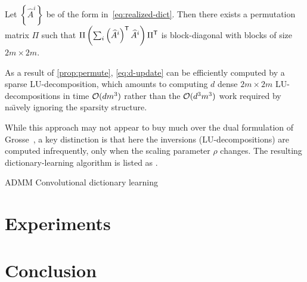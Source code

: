 \documentclass{article} %
\begin{document}
\begin{proposition}
Let $\left\{\widehat{A}^i\right\}$ be of the form in~\eqref{eq:realized-dict}.  
Then there exists a permutation matrix $\Pi$ such that 
$\Pi\left(\sum_i \left(\widehat{A}^i\right)^\mathsf{T} \widehat{A}^i \right)\Pi^\mathsf{T}$ 
is block-diagonal with blocks of size $2m\times 2m$.\label{prop:permute}
\end{proposition}

As a result of \cref{prop:permute}, \eqref{eq:d-update} can be efficiently computed by
a sparse LU-decomposition, which amounts to computing $d$ dense $2m\times2m$
LU-decompositions in time $\mathcal{O}(dm^3)$ rather than the $\mathcal{O}(d^3m^3)$ work required by 
na\"{\i}vely ignoring the sparsity structure.

While this approach may not appear to buy much over the dual formulation of Grosse~\etal, 
a key distinction is that here the inversions (LU-decompositions) are computed
infrequently, only when the scaling parameter $\rho$ changes.  The resulting
dictionary-learning algorithm is listed as .

\begin{algorithm}[t]
\caption{ADMM Convolutional dictionary learning}
\label{alg:dict}
\begin{algorithmic}[1]

\REPEAT{}



\end{algorithmic}
\end{algorithm}


\section{Experiments}

\section{Conclusion}



\end{document}
